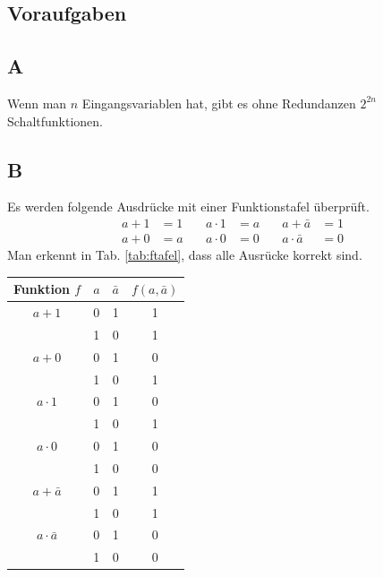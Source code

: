 \documentclass[10pt]{article}
\begin{document}
\begin{multicols}{2}
	\section{Voraufgaben}
	\subsection*{A}
	Wenn man $n$ Eingangsvariablen hat, gibt es ohne Redundanzen $2^{2n}$ Schaltfunktionen.
	\subsection*{B}
	Es werden folgende Ausdrücke mit einer Funktionstafel überprüft.
	\begin{align*}
		a + 1 & = 1 \quad & a \cdot 1 & = a \quad & a + \bar{a}     & = 1 \\
		a + 0 & = a \quad & a \cdot 0 & = 0 \quad & a \cdot \bar{a} & = 0
	\end{align*}
	Man erkennt in Tab. \ref{tab:ftafel}, dass alle Ausrücke korrekt sind.

	\begin{center}
		\begin{tabular}{|c|c|c|c|}
			\hline
			\textbf{Funktion $f$} & $a$ & $\bar{a}$ & $f(a, \bar{a})$ \\
			\hline
			$a + 1$               & 0   & 1         & 1               \\
			                      & 1   & 0         & 1               \\
			\hline
			$a + 0$               & 0   & 1         & 0               \\
			                      & 1   & 0         & 1               \\
			\hline
			$a \cdot 1$           & 0   & 1         & 0               \\
			                      & 1   & 0         & 1               \\
			\hline
			$a \cdot 0$           & 0   & 1         & 0               \\
			                      & 1   & 0         & 0               \\
			\hline
			$a + \bar{a}$         & 0   & 1         & 1               \\
			                      & 1   & 0         & 1               \\
			\hline
			$a \cdot \bar{a}$     & 0   & 1         & 0               \\
			                      & 1   & 0         & 0               \\
			\hline
		\end{tabular}
		\label{tab:ftafel}
	\end{center}

\end{multicols}
\end{document}

